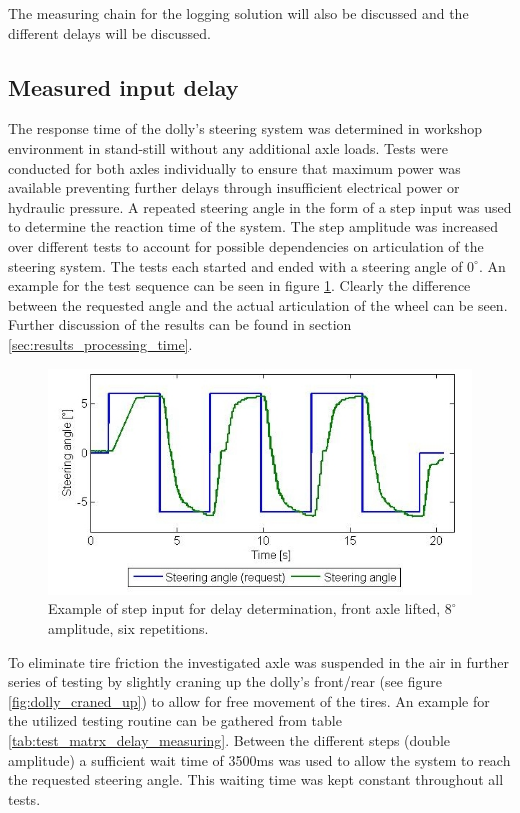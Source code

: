 \documentclass[ExampleMasters.tex]{subfiles}
\begin{document}
The measuring chain for the logging solution will also be discussed and the different delays will be discussed. 

\subsection{Measured input delay}
\label{sec:measuring_delay}

The response time of the dolly's steering system was determined in workshop environment in stand-still without any additional axle loads. Tests were conducted for both axles individually to ensure that maximum power was available preventing further delays through insufficient electrical power or hydraulic pressure. A repeated steering angle in the form of a step input was used to determine the reaction time of the system. The step amplitude was increased over different tests to account for possible dependencies on articulation of the steering system. The tests each started and ended with a steering angle of $0^\circ .$ An example for the test sequence can be seen in figure \ref{fig:example_for_step_input_delay_measuring}. Clearly the difference between the requested angle and the actual articulation of the wheel can be seen. Further discussion of the results can be found in section \ref{sec:results_processing_time}.\\

\begin{figure}
\centering
\includegraphics[width=1\linewidth]{figures/example_for_step_input_delay_measuring}
\caption{Example of step input for delay determination, front axle lifted, $8^\circ $ amplitude, six repetitions.}
\label{fig:example_for_step_input_delay_measuring}
\end{figure}


To eliminate tire friction the investigated axle was suspended in the air in further series of testing by slightly craning up the dolly's front/rear (see figure \ref{fig:dolly_craned_up}) to allow for free movement of the tires. An example for the utilized testing routine can be gathered from table \ref{tab:test_matrx_delay_measuring}. Between the different steps (double amplitude) a sufficient wait time of 3500ms was used to allow the system to reach the requested steering angle. This waiting time was kept constant throughout all tests. \\
\end{document}
